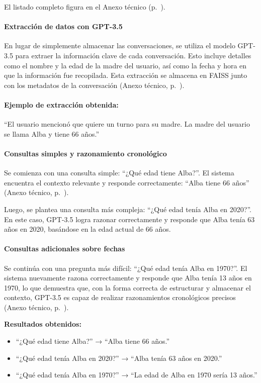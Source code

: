 El listado completo figura en el Anexo técnico (p.~\pageref{anexo:code-4-1-9-2}).

\paragraph{Extracción de datos con GPT-3.5}

En lugar de simplemente almacenar las conversaciones, se utiliza el modelo GPT-3.5 para extraer la información clave de cada conversación. Esto incluye detalles como el nombre y la edad de la madre del usuario, así como la fecha y hora en que la información fue recopilada. Esta extracción se almacena en FAISS junto con los metadatos de la conversación (Anexo técnico, p.~\pageref{anexo:code-4-1-9-3}).

\paragraph{Ejemplo de extracción obtenida:}
``El usuario mencionó que quiere un turno para su madre. La madre del usuario se llama Alba y tiene 66 años.''

\paragraph{Consultas simples y razonamiento cronológico}

Se comienza con una consulta simple: ``¿Qué edad tiene Alba?''. El sistema encuentra el contexto relevante y responde correctamente: ``Alba tiene 66 años'' (Anexo técnico, p.~\pageref{anexo:code-4-1-9-4}).

Luego, se plantea una consulta más compleja: ``¿Qué edad tenía Alba en 2020?''. En este caso, GPT-3.5 logra razonar correctamente y responde que Alba tenía 63 años en 2020, basándose en la edad actual de 66 años.

\paragraph{Consultas adicionales sobre fechas}

Se continúa con una pregunta más difícil: ``¿Qué edad tenía Alba en 1970?''. El sistema nuevamente razona correctamente y responde que Alba tenía 13 años en 1970, lo que demuestra que, con la forma correcta de estructurar y almacenar el contexto, GPT-3.5 es capaz de realizar razonamientos cronológicos precisos (Anexo técnico, p.~\pageref{anexo:code-4-1-9-5}).

\textbf{Resultados obtenidos:}
\begin{itemize}
    \item ``¿Qué edad tiene Alba?'' → ``Alba tiene 66 años.''
    \item ``¿Qué edad tenía Alba en 2020?'' → ``Alba tenía 63 años en 2020.''
    \item ``¿Qué edad tenía Alba en 1970?'' → ``La edad de Alba en 1970 sería 13 años.''
\end{itemize}

